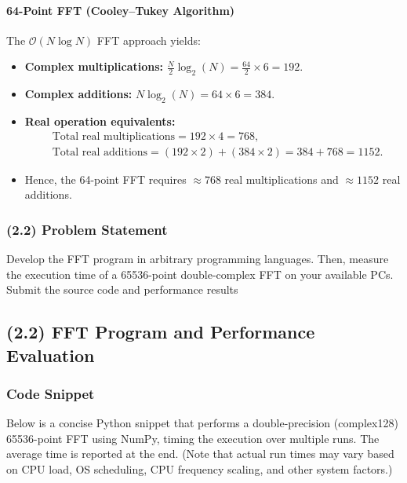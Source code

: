 \documentclass[11pt]{article}
\begin{document}
\paragraph{64-Point FFT (Cooley--Tukey Algorithm)}
The \(\mathcal{O}(N \log N)\) FFT approach yields:
\begin{itemize}
\item \textbf{Complex multiplications:} \(\tfrac{N}{2}\log_2(N) = \tfrac{64}{2}\times 6 = 192.\)
\item \textbf{Complex additions:} \(N \log_2(N) = 64 \times 6 = 384.\)
\item \textbf{Real operation equivalents:}
\[
\begin{aligned}
&\text{Total real multiplications} = 192 \times 4 = 768,\\
&\text{Total real additions} = (192 \times 2) + (384 \times 2) = 384 + 768 = 1152.
\end{aligned}
\]
\item Hence, the 64-point FFT requires \(\approx 768\) real multiplications and \(\approx 1152\) real additions.
\end{itemize}

\bigskip

\subsubsection*{(2.2) Problem Statement}

Develop the FFT program in arbitrary programming languages.
Then, measure the execution time of a 65536-point double-complex FFT on your
available PCs. Submit the source code and performance results

\subsection*{(2.2) FFT Program and Performance Evaluation}

\subsubsection*{Code Snippet}

Below is a concise Python snippet that performs a double-precision (complex128) 65536-point FFT using NumPy, timing the execution over multiple runs. The average time is reported at the end. (Note that actual run times may vary based on CPU load, OS scheduling, CPU frequency scaling, and other system factors.)
\end{document}
